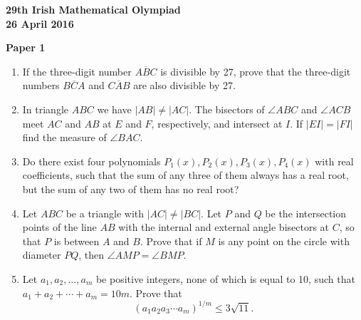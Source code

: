 \documentclass[12pt]{article}
\begin{document}
\begin{center}
{\large\bfseries 29th Irish Mathematical Olympiad\\26 April 2016}
\end{center}
\bigskip\noindent\textbf{Paper 1}\bigskip
\begin{enumerate}
\item If the three-digit number $\overline{ABC}$ is divisible by 27, prove that the three-digit numbers $\overline{BCA}$ and $\overline{CAB}$ are also divisible by 27.

\item In triangle $ABC$ we have $|AB| \neq |AC|$. The bisectors of $\angle ABC$ and $\angle ACB$ meet $AC$ and $AB$ at $E$ and $F$, respectively, and intersect at $I$. If $|EI| = |FI|$ find the measure of $\angle BAC$.

\item Do there exist four polynomials $P_1(x), P_2(x), P_3(x), P_4(x)$ with real coefficients, such that the sum of any three of them always has a real root, but the sum of any two of them has no real root?

\item Let $ABC$ be a triangle with $|AC| \neq |BC|$. Let $P$ and $Q$ be the intersection points of the line $AB$ with the internal and external angle bisectors at $C$, so that $P$ is between $A$ and $B$. Prove that if $M$ is any point on the circle with diameter $PQ$, then $\angle AMP = \angle BMP$.

\item Let $a_1, a_2, \ldots, a_m$ be positive integers, none of which is equal to 10, such that $a_1 + a_2 + \cdots + a_m = 10m$. Prove that
\[
(a_1 a_2 a_3 \cdots a_m)^{1/m} \leq 3\sqrt{11}.
\]
\end{enumerate}
\end{document}
